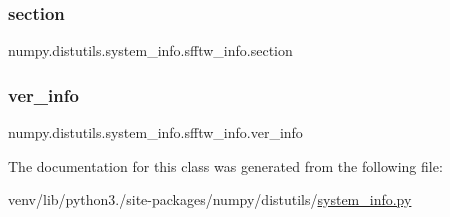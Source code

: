 \subsubsection{\texorpdfstring{section}{section}}
{\footnotesize\ttfamily numpy.\+distutils.\+system\+\_\+info.\+sfftw\+\_\+info.\+section\hspace{0.3cm}{\ttfamily [static]}}

\mbox{\label{classnumpy_1_1distutils_1_1system__info_1_1sfftw__info_a59c521ae7bc0795fcd39a5e0f0df8b35}} 
\subsubsection{\texorpdfstring{ver\+\_\+info}{ver\_info}}
{\footnotesize\ttfamily numpy.\+distutils.\+system\+\_\+info.\+sfftw\+\_\+info.\+ver\+\_\+info\hspace{0.3cm}{\ttfamily [static]}}



The documentation for this class was generated from the following file\+:\begin{DoxyCompactItemize}
\item 
venv/lib/python3./site-\/packages/numpy/distutils/\hyperlink{system__info_8py}{system\+\_\+info.\+py}\end{DoxyCompactItemize}
